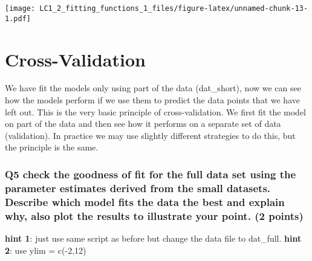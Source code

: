 \documentclass[]{article}
\newenvironment{Shaded}{\begin{snugshade}}{\end{snugshade}}
\newcommand{\KeywordTok}[1]{\textcolor[rgb]{0.13,0.29,0.53}{\textbf{#1}}}
\newcommand{\DataTypeTok}[1]{\textcolor[rgb]{0.13,0.29,0.53}{#1}}
\newcommand{\DecValTok}[1]{\textcolor[rgb]{0.00,0.00,0.81}{#1}}
\newcommand{\StringTok}[1]{\textcolor[rgb]{0.31,0.60,0.02}{#1}}
\newcommand{\OperatorTok}[1]{\textcolor[rgb]{0.81,0.36,0.00}{\textbf{#1}}}
\newcommand{\NormalTok}[1]{#1}
\begin{document}
\begin{Shaded}
\end{Shaded}

\texttt{[image: LC1\_2\_fitting\_functions\_1\_files/figure-latex/unnamed-chunk-13-1.pdf]}

\section{Cross-Validation}\label{cross-validation}

We have fit the models only using part of the data (dat\_short), now we
can see how the models perform if we use them to predict the data points
that we have left out. This is the very basic principle of
cross-validation. We first fit the model on part of the data and then
see how it performs on a separate set of data (validation). In practice
we may use slightly different strategies to do this, but the principle
is the same.

\subsubsection{Q5 check the goodness of fit for the full data set using
the parameter estimates derived from the small datasets. Describe which
model fits the data the best and explain why, also plot the results to
illustrate your point. (2
points)}\label{q5-check-the-goodness-of-fit-for-the-full-data-set-using-the-parameter-estimates-derived-from-the-small-datasets.-describe-which-model-fits-the-data-the-best-and-explain-why-also-plot-the-results-to-illustrate-your-point.-2-points}

\textbf{hint 1}: just use same script as before but change the data file
to dat\_full. \textbf{hint 2}: use ylim = c(-2,12)
\end{document}
